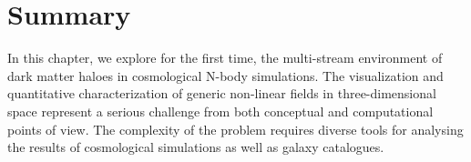 


\section{Summary}
In this chapter, we explore for the first time, the multi-stream environment of dark matter haloes in cosmological N-body simulations.
The visualization and quantitative characterization of generic non-linear fields in three-dimensional space represent a serious
challenge from both conceptual and computational points of view. The complexity of the problem requires diverse tools
for analysing the results of cosmological simulations as well as galaxy catalogues.




